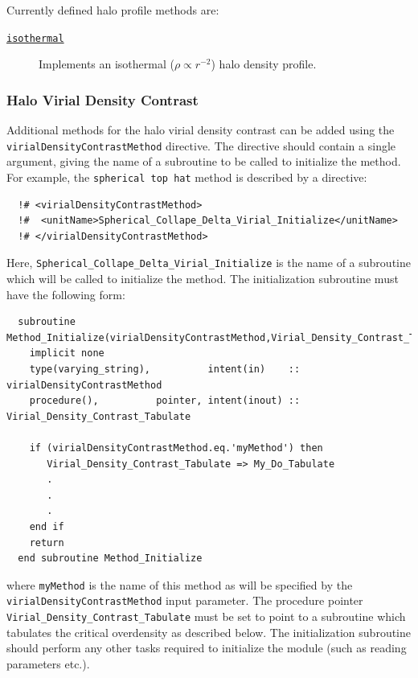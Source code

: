 Currently defined halo profile methods are:
\begin{description}
 \item [\hyperlink{dark_matter_profiles.isothermal.F90:dark_matter_profiles_isothermal:dark_matter_profile_isothermal_initialize}{{\tt isothermal}}] Implements an isothermal ($\rho \propto r^{-2}$) halo density profile.
\end{description}

\subsubsection{Halo Virial Density Contrast}

Additional methods for the halo virial density contrast can be added using the {\tt virialDensityContrastMethod} directive. The directive should contain a single argument, giving the name of a subroutine to be called to initialize the method. For example, the {\tt spherical top hat} method is described by a directive:
\begin{verbatim}
  !# <virialDensityContrastMethod>
  !#  <unitName>Spherical_Collape_Delta_Virial_Initialize</unitName>
  !# </virialDensityContrastMethod>
\end{verbatim}
Here, {\tt Spherical\_Collape\_Delta\_Virial\_Initialize} is the name of a subroutine which will be called to initialize the method. The initialization subroutine must have the following form:
\begin{verbatim}
  subroutine Method_Initialize(virialDensityContrastMethod,Virial_Density_Contrast_Tabulate)
    implicit none
    type(varying_string),          intent(in)    :: virialDensityContrastMethod
    procedure(),          pointer, intent(inout) :: Virial_Density_Contrast_Tabulate

    if (virialDensityContrastMethod.eq.'myMethod') then
       Virial_Density_Contrast_Tabulate => My_Do_Tabulate
       .
       .
       .
    end if
    return
  end subroutine Method_Initialize
\end{verbatim}
where {\tt myMethod} is the name of this method as will be specified by the {\tt virialDensityContrastMethod} input parameter. The procedure pointer {\tt Virial\_Density\_Contrast\_Tabulate} must be set to point to a subroutine which tabulates the critical overdensity as described below. The initialization subroutine should perform any other tasks required to initialize the module (such as reading parameters etc.).

